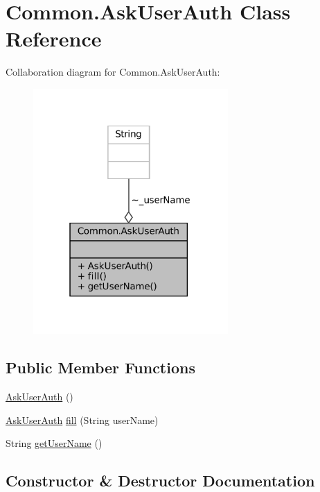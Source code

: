 \hypertarget{classCommon_1_1AskUserAuth}{}\section{Common.\+Ask\+User\+Auth Class Reference}
\label{classCommon_1_1AskUserAuth}


Collaboration diagram for Common.\+Ask\+User\+Auth\+:
\nopagebreak
\begin{figure}[H]
\begin{center}
\leavevmode
\includegraphics[width=211pt]{classCommon_1_1AskUserAuth__coll__graph}
\end{center}
\end{figure}
\subsection*{Public Member Functions}
\begin{DoxyCompactItemize}
\item 
\mbox{\hyperlink{classCommon_1_1AskUserAuth_afd1ec4231586d78ba3e42cda8416b120}{Ask\+User\+Auth}} ()
\item 
\mbox{\hyperlink{classCommon_1_1AskUserAuth}{Ask\+User\+Auth}} \mbox{\hyperlink{classCommon_1_1AskUserAuth_a1d4f4f3c59ac514089350064ef2d6aa8}{fill}} (String user\+Name)
\item 
String \mbox{\hyperlink{classCommon_1_1AskUserAuth_a123a0212f009ba34d8455a405cb90c0c}{get\+User\+Name}} ()
\end{DoxyCompactItemize}


\subsection{Constructor \& Destructor Documentation}
\mbox{\label{classCommon_1_1AskUserAuth_afd1ec4231586d78ba3e42cda8416b120}} 
